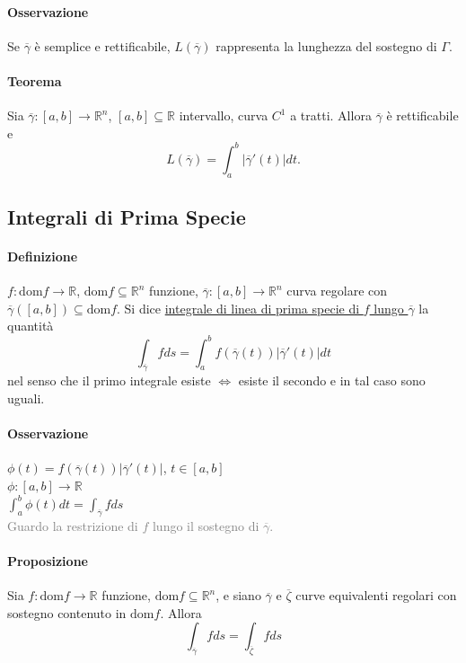 \documentclass{article}
\newcommand{\R}{\mathbb{R}}
\newcommand{\dom}{\text{dom}}
\begin{document}
\paragraph{{Osservazione}}
Se $\overline{\gamma}$ è semplice e rettificabile, $L(\overline{\gamma})$ rappresenta la lunghezza del sostegno di $\Gamma$.

\paragraph{{Teorema}}
Sia $\overline{\gamma}:[a,b]\rightarrow \R^n$, $[a,b] \subseteq \R$ intervallo, curva $C^1$ a tratti. Allora $\overline{\gamma}$ è rettificabile e 
\begin{equation*}
    L(\overline{\gamma})=\int_{a}^{b}|\overline{\gamma}'(t)|dt.
\end{equation*}

\subsection{{Integrali di Prima Specie}}
\paragraph{{Definizione}}
$f:\dom f \rightarrow \R$, $\dom f \subseteq \R^n$ funzione, $\overline{\gamma}:[a,b]\rightarrow \R^n$ curva regolare con $\overline{\gamma}([a,b])\subseteq \dom f$. Si dice \underline{integrale di linea di prima specie di $f$ lungo $\overline{\gamma}$} la quantità
\begin{equation*}
    \int_{\overline{\gamma}}f ds = \int_a^bf(\overline{\gamma}(t))|\overline{\gamma}'(t)|dt
\end{equation*}
nel senso che il primo integrale esiste $\Leftrightarrow$ esiste il secondo e in tal caso sono uguali.

\paragraph{{Osservazione}}
$\phi(t)=f(\overline{\gamma}(t))|\overline{\gamma}'(t)|$, $t\in[a,b]$\\
$\phi: [a,b]\rightarrow \R$\\
$\int_a^b \phi(t)dt=\int_{\overline{\gamma}}f ds$\\
\textcolor{grey}{Guardo la restrizione di $f$ lungo il sostegno di $\overline{\gamma}$.}

\paragraph{{Proposizione}}
Sia $f: \dom f \rightarrow \R$ funzione, $\dom f \subseteq \R^n$, e siano $\overline{\gamma}$ e $\overline{\zeta}$ curve equivalenti regolari con sostegno contenuto in $\dom f$. Allora
\begin{equation*}
    \int_{\overline{\gamma}}f ds = \int_{\overline{\zeta}}f ds
\end{equation*}
\end{document}
